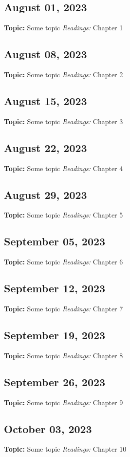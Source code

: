 \subsection*{August 01, 2023}
\textbf{Topic:} Some topic
\textit{Readings:}
Chapter  1 

\subsection*{August 08, 2023}
\textbf{Topic:} Some topic
\textit{Readings:}
Chapter  2 

\subsection*{August 15, 2023}
\textbf{Topic:} Some topic
\textit{Readings:}
Chapter  3 

\subsection*{August 22, 2023}
\textbf{Topic:} Some topic
\textit{Readings:}
Chapter  4 

\subsection*{August 29, 2023}
\textbf{Topic:} Some topic
\textit{Readings:}
Chapter  5 

\subsection*{September 05, 2023}
\textbf{Topic:} Some topic
\textit{Readings:}
Chapter  6 

\subsection*{September 12, 2023}
\textbf{Topic:} Some topic
\textit{Readings:}
Chapter  7 

\subsection*{September 19, 2023}
\textbf{Topic:} Some topic
\textit{Readings:}
Chapter  8 

\subsection*{September 26, 2023}
\textbf{Topic:} Some topic
\textit{Readings:}
Chapter  9 

\subsection*{October 03, 2023}
\textbf{Topic:} Some topic
\textit{Readings:}
Chapter  10 

